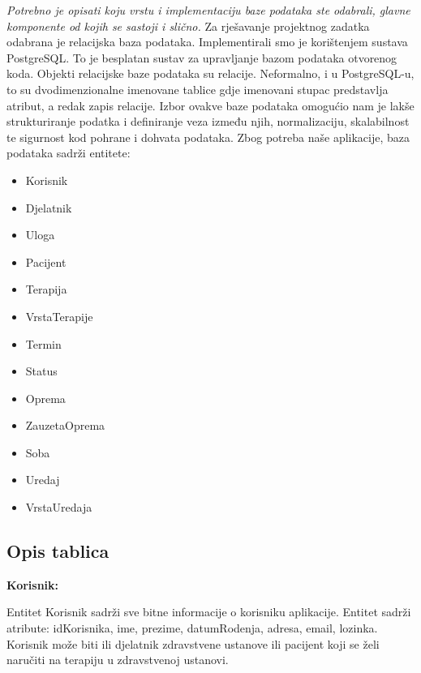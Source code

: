 		\textit{Potrebno je opisati koju vrstu i implementaciju baze podataka ste odabrali, glavne komponente od kojih se sastoji i slično.}
\textnormal{Za rješavanje projektnog zadatka odabrana je relacijska baza podataka. Implementirali smo je korištenjem sustava PostgreSQL. To je besplatan sustav za upravljanje bazom podataka otvorenog koda. Objekti relacijske baze podataka su relacije. Neformalno, i u PostgreSQL-u, to su dvodimenzionalne imenovane tablice gdje imenovani stupac predstavlja atribut, a redak zapis relacije. Izbor ovakve baze podataka omogućio nam je lakše strukturiranje podatka i definiranje veza između njih, normalizaciju, skalabilnost te sigurnost kod pohrane i dohvata podataka. 
Zbog potreba naše aplikacije, baza podataka sadrži entitete:}
             \begin{itemize}
		\item 	\textnormal{Korisnik}
		\item 	\textnormal{Djelatnik}
		\item 	\textnormal{Uloga}
                   \item 	\textnormal{Pacijent}
                   \item 	\textnormal{Terapija}
                   \item 	\textnormal{VrstaTerapije}	
                   \item 	\textnormal{Termin}			
                   \item 	\textnormal{Status}	
                   \item 	\textnormal{Oprema}
                   \item 	\textnormal{ZauzetaOprema}	
                   \item 	\textnormal{Soba}	
                   \item 	\textnormal{Uredaj}
                   \item 	\textnormal{VrstaUredaja}
                   				
	 \end{itemize}

		
			\subsection{Opis tablica}
			
 \textbf{Korisnik:}

 \textnormal{Entitet Korisnik sadrži sve bitne informacije o korisniku aplikacije. Entitet sadrži atribute: idKorisnika, ime, prezime, datumRodenja, adresa, email, lozinka. Korisnik može biti ili djelatnik zdravstvene ustanove ili pacijent koji se želi naručiti na terapiju u zdravstvenoj ustanovi.}


